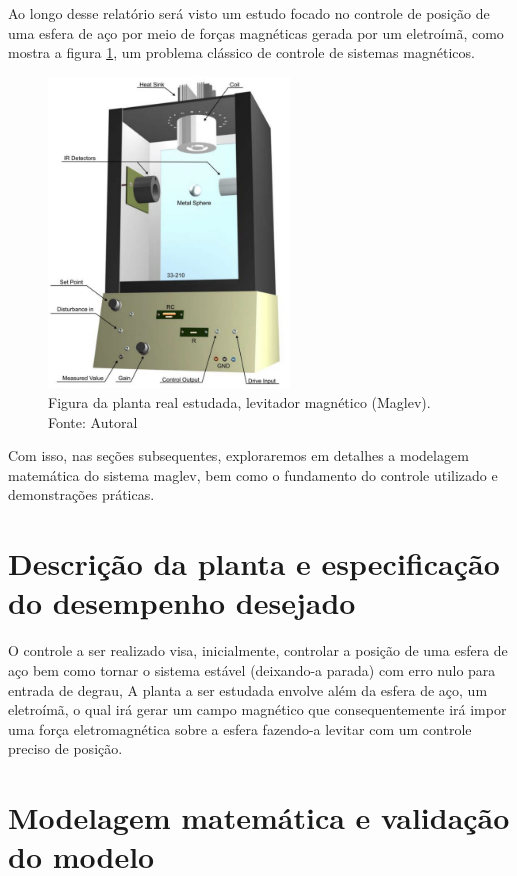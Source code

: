 \documentclass{ifacconf}
\begin{document}
Ao longo desse relatório será visto um estudo focado no controle de posição de uma esfera de aço por meio de forças magnéticas 
gerada por um eletroímã, como mostra a figura \ref{fig:planta_padrao}, um problema
clássico de controle de sistemas magnéticos. 

\begin{figure}[!htb]
  \begin{center}
  \includegraphics[width=6.4cm]{figures/planta_padrao.png}    %
  \caption{Figura da planta real estudada, levitador magnético (Maglev). Fonte: Autoral} 
  \label{fig:planta_padrao}
  \end{center}
\end{figure}

Com isso, nas seções subsequentes, exploraremos em detalhes a modelagem matemática do sistema
maglev, bem como o fundamento do controle utilizado e demonstrações práticas.

\section{Descrição da planta e especificação do desempenho desejado}

O controle a ser realizado visa, inicialmente, controlar a posição de uma esfera de aço bem como tornar o sistema estável (deixando-a parada) com erro nulo para entrada de degrau, 
A planta a ser estudada envolve além da esfera de aço, um eletroímã, o qual irá gerar um campo magnético que
consequentemente irá impor uma força eletromagnética sobre a esfera fazendo-a levitar com um controle preciso de posição.


\section{Modelagem matemática e validação do modelo}
\end{document}
